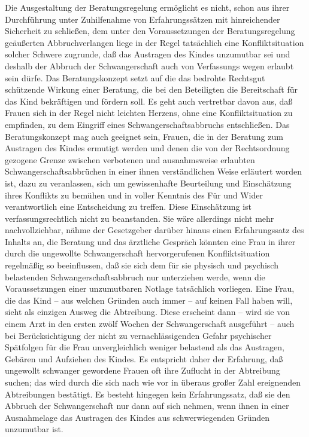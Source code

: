 \documentclass[12pt]{article}
\begin{document}
\begin{sourcepara}[title={原文D.98}]
Die Ausgestaltung der Beratungsregelung ermöglicht es nicht, schon aus ihrer Durchführung unter Zuhilfenahme von Erfahrungssätzen mit hinreichender Sicherheit zu schließen, dem unter den Voraussetzungen der Beratungsregelung geäußerten Abbruchverlangen liege in der Regel tatsächlich eine Konfliktsituation solcher Schwere zugrunde, daß das Austragen des Kindes unzumutbar sei und deshalb der Abbruch der Schwangerschaft auch von Verfassungs wegen erlaubt sein dürfe. Das Beratungskonzept setzt auf die das bedrohte Rechtsgut schützende Wirkung einer Beratung, die bei den Beteiligten die Bereitschaft für das Kind bekräftigen und fördern soll. Es geht auch vertretbar davon aus, daß Frauen sich in der Regel nicht leichten Herzens, ohne eine Konfliktsituation zu empfinden, zu dem Eingriff eines Schwangerschaftsabbruchs entschließen. Das Beratungskonzept mag auch geeignet sein, Frauen, die in der Beratung zum Austragen des Kindes ermutigt werden und denen die von der Rechtsordnung gezogene Grenze zwischen verbotenen und ausnahmsweise erlaubten Schwangerschaftsabbrüchen in einer ihnen verständlichen Weise erläutert worden ist, dazu zu veranlassen, sich um gewissenhafte Beurteilung und Einschätzung ihres Konflikts zu bemühen und in voller Kenntnis des Für und Wider verantwortlich eine Entscheidung zu treffen. Diese Einschätzung ist verfassungsrechtlich nicht zu beanstanden. Sie wäre allerdings nicht mehr nachvollziehbar, nähme der Gesetzgeber darüber hinaus einen Erfahrungssatz des Inhalts an, die Beratung und das ärztliche Gespräch könnten eine Frau in ihrer durch die ungewollte Schwangerschaft hervorgerufenen Konfliktsituation regelmäßig so beeinflussen, daß sie sich dem für sie physisch und psychisch belastenden Schwangerschaftsabbruch nur unterziehen werde, wenn die Voraussetzungen einer unzumutbaren Notlage tatsächlich vorliegen. Eine Frau, die das Kind -- aus welchen Gründen auch immer -- auf keinen Fall haben will, sieht als einzigen Ausweg die Abtreibung. Diese erscheint dann -- wird sie von einem Arzt in den ersten zwölf Wochen der Schwangerschaft ausgeführt -- auch bei Berücksichtigung der nicht zu vernachlässigenden Gefahr psychischer Spätfolgen für die Frau unvergleichlich weniger belastend als das Austragen, Gebären und Aufziehen des Kindes. Es entspricht daher der Erfahrung, daß ungewollt schwanger gewordene Frauen oft ihre Zuflucht in der Abtreibung suchen; das wird durch die sich nach wie vor in überaus großer Zahl ereignenden Abtreibungen bestätigt. Es besteht hingegen kein Erfahrungssatz, daß sie den Abbruch der Schwangerschaft nur dann auf sich nehmen, wenn ihnen in einer Ausnahmelage das Austragen des Kindes aus schwerwiegenden Gründen unzumutbar ist.
\end{sourcepara}
\end{document}
